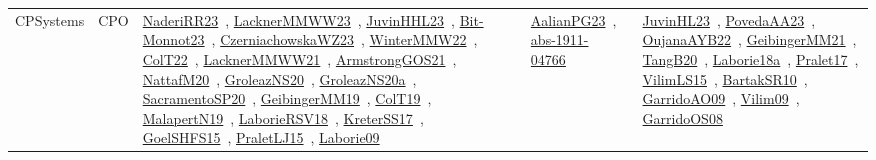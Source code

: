 {\begin{longtable}{lp{3cm}>{\raggedright\arraybackslash}p{6cm}>{\raggedright\arraybackslash}p{6cm}>{\raggedright\arraybackslash}p{8cm}}
CPSystems & CPO & \href{articles/NaderiRR23.pdf}{NaderiRR23}~\cite{NaderiRR23}, \href{articles/LacknerMMWW23.pdf}{LacknerMMWW23}~\cite{LacknerMMWW23}, \href{papers/JuvinHHL23.pdf}{JuvinHHL23}~\cite{JuvinHHL23}, \href{papers/Bit-Monnot23.pdf}{Bit-Monnot23}~\cite{Bit-Monnot23}, \href{articles/CzerniachowskaWZ23.pdf}{CzerniachowskaWZ23}~\cite{CzerniachowskaWZ23}, \href{papers/WinterMMW22.pdf}{WinterMMW22}~\cite{WinterMMW22}, \href{articles/ColT22.pdf}{ColT22}~\cite{ColT22}, \href{papers/LacknerMMWW21.pdf}{LacknerMMWW21}~\cite{LacknerMMWW21}, \href{papers/ArmstrongGOS21.pdf}{ArmstrongGOS21}~\cite{ArmstrongGOS21}, \href{papers/NattafM20.pdf}{NattafM20}~\cite{NattafM20}, \href{papers/GroleazNS20.pdf}{GroleazNS20}~\cite{GroleazNS20}, \href{papers/GroleazNS20a.pdf}{GroleazNS20a}~\cite{GroleazNS20a}, \href{articles/SacramentoSP20.pdf}{SacramentoSP20}~\cite{SacramentoSP20}, \href{papers/GeibingerMM19.pdf}{GeibingerMM19}~\cite{GeibingerMM19}, \href{papers/ColT19.pdf}{ColT19}~\cite{ColT19}, \href{papers/MalapertN19.pdf}{MalapertN19}~\cite{MalapertN19}, \href{articles/LaborieRSV18.pdf}{LaborieRSV18}~\cite{LaborieRSV18}, \href{articles/KreterSS17.pdf}{KreterSS17}~\cite{KreterSS17}, \href{articles/GoelSHFS15.pdf}{GoelSHFS15}~\cite{GoelSHFS15}, \href{papers/PraletLJ15.pdf}{PraletLJ15}~\cite{PraletLJ15}, \href{papers/Laborie09.pdf}{Laborie09}~\cite{Laborie09} & \href{papers/AalianPG23.pdf}{AalianPG23}~\cite{AalianPG23}, \href{articles/abs-1911-04766.pdf}{abs-1911-04766}~\cite{abs-1911-04766} & \href{papers/JuvinHL23.pdf}{JuvinHL23}~\cite{JuvinHL23}, \href{papers/PovedaAA23.pdf}{PovedaAA23}~\cite{PovedaAA23}, \href{papers/OujanaAYB22.pdf}{OujanaAYB22}~\cite{OujanaAYB22}, \href{papers/GeibingerMM21.pdf}{GeibingerMM21}~\cite{GeibingerMM21}, \href{papers/TangB20.pdf}{TangB20}~\cite{TangB20}, \href{papers/Laborie18a.pdf}{Laborie18a}~\cite{Laborie18a}, \href{papers/Pralet17.pdf}{Pralet17}~\cite{Pralet17}, \href{papers/VilimLS15.pdf}{VilimLS15}~\cite{VilimLS15}, \href{articles/BartakSR10.pdf}{BartakSR10}~\cite{BartakSR10}, \href{articles/GarridoAO09.pdf}{GarridoAO09}~\cite{GarridoAO09}, \href{papers/Vilim09.pdf}{Vilim09}~\cite{Vilim09}, \href{articles/GarridoOS08.pdf}{GarridoOS08}~\cite{GarridoOS08}\\

\end{longtable}}
